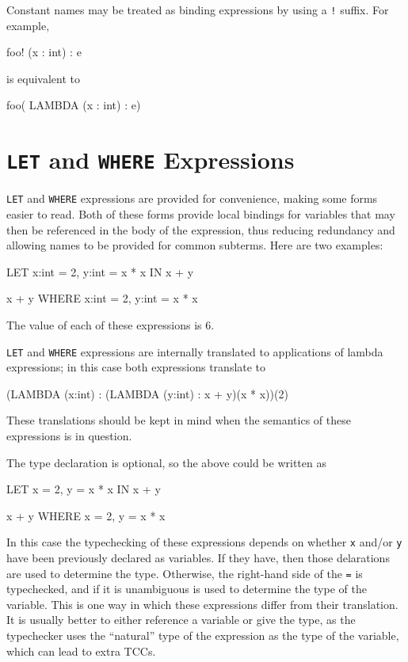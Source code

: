 Constant names may be treated as binding expressions by using a
\texttt{!}  suffix.  For example,
\begin{pvsex}
foo! (x : int) : e
\end{pvsex}
is equivalent to
\begin{pvsex}
foo( LAMBDA (x : int) : e)
\end{pvsex}

\section{\texttt{LET} and \texttt{WHERE} Expressions}

\texttt{LET} and \texttt{WHERE} expressions are provided for convenience,
making some forms easier to read.  Both of these forms provide local
bindings for variables that may then be referenced in the body of the
expression, thus reducing redundancy and allowing names to be provided for common subterms.
Here are two examples:
\begin{pvsex}
  LET x:int = 2, y:int = x * x IN x + y

  x + y WHERE x:int = 2, y:int = x * x
\end{pvsex}
%
The value of each of these expressions is 6.

\texttt{LET} and \texttt{WHERE} expressions are internally translated to
applications of lambda expressions; in this case both expressions
translate to
\begin{pvsex}
  (LAMBDA (x:int) : (LAMBDA (y:int) : x + y)(x * x))(2)
\end{pvsex}
%
These translations should be kept in mind when the semantics of these
expressions is in question.

The type declaration is optional, so the above could be written as
\begin{pvsex}
  LET x = 2, y = x * x IN x + y

  x + y WHERE x = 2, y = x * x
\end{pvsex}
In this case the typechecking of these expressions depends on whether
\texttt{x} and/or \texttt{y} have been previously declared as variables.
If they have, then those delarations are used to determine the type.
Otherwise, the right-hand side of the \texttt{=} is typechecked, and if it
is unambiguous is used to determine the type of the variable.  This is 
one way in which these expressions differ from their translation.
It is usually better to either reference a variable or give the type, as
the typechecker uses the ``natural'' type of the expression as the type of
the variable, which can lead to extra TCCs.

